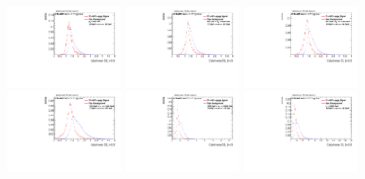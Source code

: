 \begin{figure}[H]
\bigskip
\includegraphics[width=0.3\textwidth]{sascha_input/Appendix/Distributions/w/distributions/beta05/h_recoJet_D2_05_bin1.pdf} \hspace{1mm}
\includegraphics[width=0.3\textwidth]{sascha_input/Appendix/Distributions/w/distributions/beta05/h_recoJet_D2_05_bin2.pdf} \hspace{1mm}
\includegraphics[width=0.3\textwidth]{sascha_input/Appendix/Distributions/w/distributions/beta05/h_recoJet_D2_05_bin3.pdf} 
\bigskip
\includegraphics[width=0.3\textwidth]{sascha_input/Appendix/Distributions/w/distributions/beta05/h_recoJet_D2_05_bin4.pdf} \hspace{1mm}
\includegraphics[width=0.3\textwidth]{sascha_input/Appendix/Distributions/w/distributions/beta05/h_recoJet_D2_05_bin5.pdf} \hspace{1mm}
\includegraphics[width=0.3\textwidth]{sascha_input/Appendix/Distributions/w/distributions/beta05/h_recoJet_D2_05_bin6.pdf}

\end{figure}

